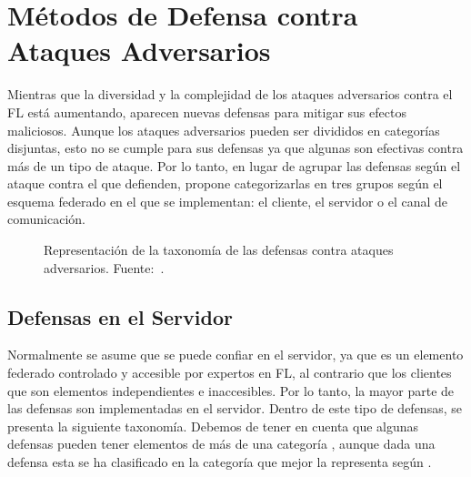 \section{Métodos de Defensa contra Ataques Adversarios}
Mientras que la diversidad y la complejidad de los ataques adversarios contra el \ac{FL} está aumentando, aparecen nuevas defensas para mitigar sus efectos maliciosos. Aunque los ataques adversarios pueden ser divididos en categorías disjuntas, esto no se cumple para sus defensas ya que algunas son efectivas contra más de un tipo de ataque. Por lo tanto, en lugar de agrupar las defensas según el ataque contra el que defienden, \cite{survey-nuria-2023} propone categorizarlas en tres grupos según el esquema federado en el que se implementan: el cliente, el servidor o el canal de comunicación.

\begin{figure}[!t]
\centering

\caption{Representación de la taxonomía de las defensas contra ataques adversarios. Fuente:~\cite{survey-nuria-2023}.}
\label{fig:defences}
\end{figure}

\subsection{Defensas en el Servidor}
Normalmente se asume que se puede confiar en el servidor, ya que es un elemento federado controlado y accesible por expertos en \ac{FL}, al contrario que los clientes que son elementos independientes e inaccesibles. Por lo tanto, la mayor parte de las defensas son implementadas en el servidor. Dentro de este tipo de defensas, se presenta la siguiente taxonomía. Debemos de tener en cuenta que algunas defensas pueden tener elementos de más de una categoría , aunque dada una defensa esta se ha clasificado en la categoría que mejor la representa según \cite{survey-nuria-2023}.

